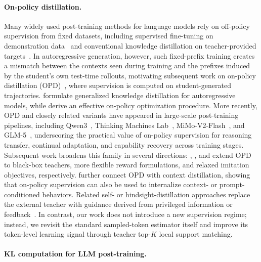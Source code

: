 \documentclass{article}
\begin{document}
\paragraph{On-policy distillation.}
Many widely used post-training methods for language models rely on off-policy supervision from fixed datasets, including supervised fine-tuning on demonstration data~\citep{ouyang2022training,openthoughts2025} and conventional knowledge distillation on teacher-provided targets~\citep{hinton2015distilling,sanh2020distilbert}. In autoregressive generation, however, such fixed-prefix training creates a mismatch between the contexts seen during training and the prefixes induced by the student's own test-time rollouts, motivating subsequent work on on-policy distillation (OPD)~\citep{opd2023}, where supervision is computed on student-generated trajectories. \citet{opd2023} formulate generalized knowledge distillation for autoregressive models, while \citet{minillm2023} derive an effective on-policy optimization procedure. More recently, OPD and closely related variants have appeared in large-scale post-training pipelines, including Qwen3~\citep{qwen3_2025}, Thinking Machines Lab~\citep{tmlopd2025}, MiMo-V2-Flash~\citep{mimo_v2_flash_2026}, and GLM-5~\citep{glm5_2026}, underscoring the practical value of on-policy supervision for reasoning transfer, continual adaptation, and capability recovery across training stages. Subsequent work broadens this family in several directions: \citet{ye2026blackboxopd}, \citet{yang2026gopd}, and \citet{ko2026reopold} extend OPD to black-box teachers, more flexible reward formulations, and relaxed imitation objectives, respectively. \citet{ye2026opcd} further connect OPD with context distillation, showing that on-policy supervision can also be used to internalize context- or prompt-conditioned behaviors. Related self- or hindsight-distillation approaches replace the external teacher with guidance derived from privileged information or feedback~\citep{zhao2026opsd,hubotter2026sdpo,wang2026openclawrl,yang2026self}. In contrast, our work does not introduce a new supervision regime; instead, we revisit the standard sampled-token estimator itself and improve its token-level learning signal through teacher top-$K$ local support matching.



\paragraph{KL computation for LLM post-training.}
\end{document}
